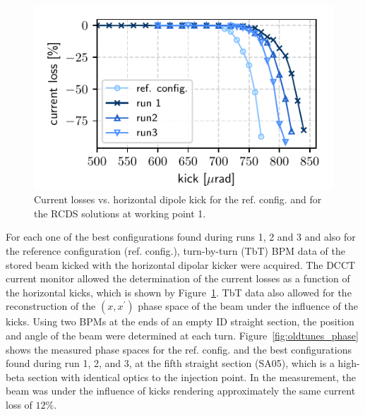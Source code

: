 \documentclass[a4paper,
               keeplastbox,   %
               ]{jacow}
\begin{document}
\begin{figure}[!h]
   \includegraphics[width=\columnwidth]{WEPL087_f1.pdf}
   \caption{Current losses vs. horizontal dipole kick for the ref. config. and for the RCDS solutions at working point 1.}
   \label{fig:loss_kicks}
\end{figure}
For each one of the best configurations found during runs 1, 2 and 3 and also for the reference configuration (ref. config.), turn-by-turn (TbT) BPM data of the stored beam kicked with the horizontal dipolar kicker were acquired. The DCCT current monitor allowed the determination of the current losses as a function of the horizontal kicks, which is shown by Figure~\ref{fig:loss_kicks}. 
TbT data also allowed for the reconstruction of the $(x,x^\prime)$ phase space of the beam under the influence of the kicks. Using two BPMs at the ends of an empty ID straight section, the position and angle of the beam were determined at each turn. 
Figure~\ref{fig:oldtunes_phase} shows the measured phase spaces for the ref. config. and the best configurations found during run 1, 2, and 3, at the fifth straight section (SA05), which is a high-beta section with identical optics to the injection point. In the measurement, the beam was under the influence of kicks rendering approximately the same current loss of $12\%$.
\end{document}
